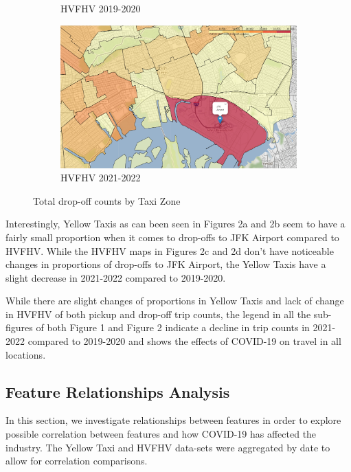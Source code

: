 \documentclass[11pt]{article}
\begin{document}
\begin{figure}
\begin{subfigure}[b]{0.4\textwidth}
        \caption[]%
        {{\small HVFHV 2019-2020}}    
        \label{}
    \end{subfigure}
    \hfill
    \begin{subfigure}[b]{0.4\textwidth}   
        \centering 
        \includegraphics[width=\textwidth]{plots/hvfhv_21_22_DOLoc_geomap.png}
        \caption[]%
        {{\small HVFHV 2021-2022}}    
        \label{}
    \end{subfigure}
    \caption[]
    {\small Total drop-off counts by Taxi Zone} 
    \label{}
\end{figure}

Interestingly, Yellow Taxis as can been seen in Figures 2a and 2b seem to have a fairly small proportion when it comes to drop-offs to JFK Airport compared to HVFHV. While the HVFHV maps in Figures 2c and 2d don't have noticeable changes in proportions of drop-offs to JFK Airport, the Yellow Taxis have a slight decrease in 2021-2022 compared to 2019-2020.

While there are slight changes of proportions in Yellow Taxis and lack of change in HVFHV of both pickup and drop-off trip counts, the legend in all the sub-figures of both Figure 1 and Figure 2 indicate a decline in trip counts in 2021-2022 compared to 2019-2020 and shows the effects of COVID-19 on travel in all locations.


\subsection{Feature Relationships Analysis}
In this section, we investigate relationships between features in order to explore possible correlation between features and how COVID-19 has affected the industry. The Yellow Taxi and HVFHV data-sets were aggregated by date to allow for correlation comparisons.
\end{document}

